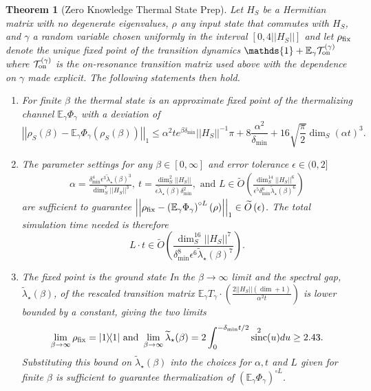 \documentclass{article}
\newtheorem{theorem}{Theorem}
\newcommand{\on}{\rm on}
\newcommand{\ketbra}[2]{| #1\rangle\! \langle #2|}
\newcommand{\norm}[1]{\left|\left| #1 \right|\right|}
\newcommand{\EE}{\mathbb{E}}
\newcommand{\TT}{\mathcal{T}}
\newcommand{\bigotilde}[1]{\widetilde{O} \left( #1 \right)}
\newcommand{\identity}{\mathds{1}}
\DeclareMathOperator{\sinc}{sinc}
\begin{document}
\begin{theorem}[Zero Knowledge Thermal State Prep] \label{thm:zero_knowledge}
    Let $H_S$ be a Hermitian matrix with no degenerate eigenvalues, $\rho$ any input state that commutes with $H_S$, and $\gamma$ a random variable chosen uniformly in the interval $[0, 4 \norm{H_S}]$ and
    let $\rho_{\rm fix}$ denote the unique fixed point of the transition dynamics $\identity + \EE_\gamma \TT_{\on}^{(\gamma)}$ where $\TT_{\on}^{(\gamma)}$ is the on-resonance transition matrix used above with the dependence on $\gamma$ made explicit. The following statements then hold.
    \begin{enumerate}
\item For finite $\beta$ the thermal state is an approximate fixed point of the thermalizing channel $\EE_\gamma \Phi_\gamma$ with a deviation of
    \begin{equation}
        \norm{\rho_S(\beta) - \EE_\gamma \Phi_\gamma(\rho_S(\beta))}_1 \le \alpha^2 t e^{\beta \delta_{\min}} \norm{H_S}^{-1} \pi + 8 \frac{\alpha^2}{\delta_{\min}} + 16 \sqrt{\frac{\pi}{2}} \dim_S (\alpha t)^3.
    \end{equation}
    \item   The parameter settings for any $\beta\in [0,\infty]$ and error tolerance $\epsilon \in (0,2]$
    \begin{align}
        \alpha = \frac{\delta_{\min}^4 \epsilon^{3} \widetilde{\lambda}_\star(\beta)^{3}}{\dim_S^7 \norm{H_S}^3}, ~t = \frac{\dim_S^2 \norm{H_S}}{\epsilon \widetilde{\lambda}_\star(\beta) \delta_{\min}^2}, \text{ and } L \in \bigotilde{\frac{\dim_S^{14} \norm{H_S}^6}{\epsilon^5 \delta_{\min}^6 \widetilde{\lambda}_\star(\beta)^{6} }}
    \end{align}
    are sufficient to guarantee $\norm{\rho_{\rm fix} - \left(\EE_\gamma \Phi_\gamma \right)^{\circ L}(\rho)}_1 \in \bigotilde{\epsilon}$.
    The total simulation time needed is therefore
    \begin{equation}
        L \cdot t \in \bigotilde{\frac{\dim_S^{16} \norm{H_S}^7}{\delta_{\min}^8 \epsilon^6 \widetilde{\lambda}_\star(\beta)^7}}.
    \end{equation}
   \item    The fixed point is the ground state In the $\beta \to \infty$ limit and the spectral gap, $\widetilde{\lambda}_\star(\beta)$, of the rescaled transition matrix $\EE_\gamma T_\gamma \cdot \left(\frac{2 \norm{H_S} (\dim + 1)}{\alpha^2 t}\right)$ is lower bounded by a constant, giving the two limits
    \begin{equation}
        \lim_{\beta \to \infty} \rho_{\rm fix} = \ketbra{1}{1} \text{ and } \lim_{\beta \to \infty} \widetilde{\lambda}_\star(\beta) = 2 \int_{0}^{-\delta_{\min}t/2} \sinc^2(u) du \ge 2.43.
        \end{equation}
    Substituting this bound on $\widetilde{\lambda}_\star(\beta)$ into the choices for $\alpha, t$ and $L$ given for finite $\beta$ is sufficient to guarantee thermalization of $\left(\EE_\gamma \Phi_\gamma \right)^{\circ L}$.
    \end{enumerate}
\end{theorem}
\end{document}
